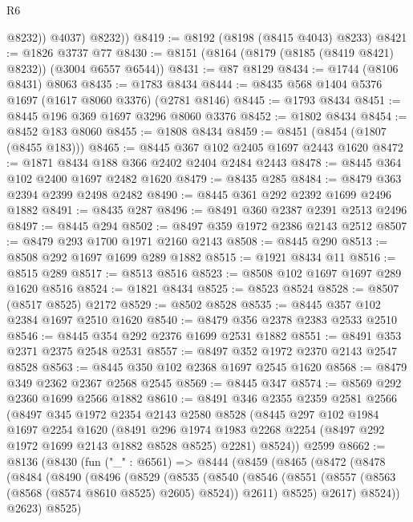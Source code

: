 \begin{lexlean}{R6}
\begin{coremodule}
              @8232))
          @4037)
        @8232))
@8419 := @8192 (@8198 (@8415 @4043) @8233)
@8421 := @1826 @3737 @77
@8430 := @8151 (@8164 (@8179 (@8185 (@8419 @8421) @8232)) (@3004 @6557 @6544))
@8431 := @87 @8129
@8434 := @1744 (@8106 @8431) @8063
@8435 := @1783 @8434
@8444 := @8435 @568 @1404 @5376 @1697 (@1617 @8060 @3376) (@2781 @8146)
@8445 := @1793 @8434
@8451 := @8445 @196 @369 @1697 @3296 @8060 @3376
@8452 := @1802 @8434
@8454 := @8452 @183 @8060
@8455 := @1808 @8434
@8459 := @8451 (@8454 (@1807 (@8455 @183)))
@8465 := @8445 @367 @102 @2405 @1697 @2443 @1620
@8472 := @1871 @8434 @188 @366 @2402 @2404 @2484 @2443
@8478 := @8445 @364 @102 @2400 @1697 @2482 @1620
@8479 := @8435 @285
@8484 := @8479 @363 @2394 @2399 @2498 @2482
@8490 := @8445 @361 @292 @2392 @1699 @2496 @1882
@8491 := @8435 @287
@8496 := @8491 @360 @2387 @2391 @2513 @2496
@8497 := @8445 @294
@8502 := @8497 @359 @1972 @2386 @2143 @2512
@8507 := @8479 @293 @1700 @1971 @2160 @2143
@8508 := @8445 @290
@8513 := @8508 @292 @1697 @1699 @289 @1882
@8515 := @1921 @8434 @11
@8516 := @8515 @289
@8517 := @8513 @8516
@8523 := @8508 @102 @1697 @1697 @289 @1620 @8516
@8524 := @1821 @8434
@8525 := @8523 @8524
@8528 := @8507 (@8517 @8525) @2172
@8529 := @8502 @8528
@8535 := @8445 @357 @102 @2384 @1697 @2510 @1620
@8540 := @8479 @356 @2378 @2383 @2533 @2510
@8546 := @8445 @354 @292 @2376 @1699 @2531 @1882
@8551 := @8491 @353 @2371 @2375 @2548 @2531
@8557 := @8497 @352 @1972 @2370 @2143 @2547 @8528
@8563 := @8445 @350 @102 @2368 @1697 @2545 @1620
@8568 := @8479 @349 @2362 @2367 @2568 @2545
@8569 := @8445 @347
@8574 := @8569 @292 @2360 @1699 @2566 @1882
@8610 := @8491
    @346
    @2355
    @2359
    @2581
    @2566
    (@8497
      @345
      @1972
      @2354
      @2143
      @2580
      @8528
      (@8445
        @297
        @102
        @1984
        @1697
        @2254
        @1620
        (@8491 @296 @1974 @1983 @2268 @2254 (@8497 @292 @1972 @1699 @2143 @1882 @8528 @8525) @2281)
        @8524))
    @2599
@8662 := @8136
    (@8430
      (fun ("_" : @6561) =>
      @8444
        (@8459
          (@8465
            (@8472
              (@8478
                (@8484
                  (@8490
                    (@8496
                      (@8529
                        (@8535
                          (@8540
                            (@8546
                              (@8551 (@8557 (@8563 (@8568 (@8574 @8610 @8525) @2605) @8524)) @2611)
                              @8525)
                            @2617)
                          @8524))
                      @2623)
                    @8525)

\end{coremodule}
\end{lexlean}
